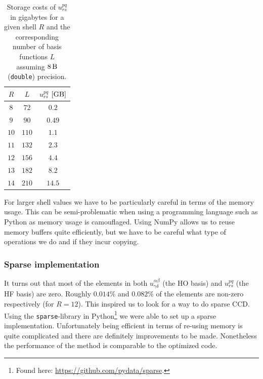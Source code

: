 \documentclass[
    a4paper, aps, twocolumn, floatfix, superscriptaddress,
    nofootinbib]{revtex4-1}
\newcommand{\1}{\mathds{1}}
\begin{document}
        \begin{table}
            \centering
            \caption{Storage costs of $u^{pq}_{rs}$ in gigabytes for a given
            shell $R$ and the corresponding number of basis functions $L$
            assuming $\SI{8}{\byte}$ (\texttt{double}) precision.}
            \begin{ruledtabular}
                \begin{tabular}{ccc}
                    $R$ & $L$ & $u^{pq}_{rs}$ $[\si{\giga\byte}]$ \\
                    \hline
                    $8$ & $72$ & $0.2$ \\
                    $9$ & $90$ & $0.49$ \\
                    $10$ & $110$ & $1.1$ \\
                    $11$ & $132$ & $2.3$ \\
                    $12$ & $156$ & $4.4$ \\
                    $13$ & $182$ & $8.2$ \\
                    $14$ & $210$ & $14.5$
                \end{tabular}
            \end{ruledtabular}
            \label{tab:memory_u}
        \end{table}

        For larger shell values we have to be particularly careful in terms of
        the memory usage. This can be semi-problematic when using a programming
        language such as Python as memory usage is camouflaged. Using NumPy
        allows us to reuse memory buffers quite efficiently, but we have to be
        careful what type of operations we do and if they incur copying.

        \subsubsection{Sparse implementation}
            It turns out that most of the elements in both
            $u^{\alpha\beta}_{\gamma\delta}$ (the HO basis) and $u^{pq}_{rs}$
            (the HF basis) are zero. Roughly $0.014\%$ and $0.082\%$ of the
            elements are non-zero respectively (for $R = 12$). This inspired us
            to look for a way to do sparse CCD. Using the
            \texttt{sparse}-library in Python\footnote{Found here:
            \url{https://github.com/pydata/sparse}.} we were able to set up a
            sparse implementation. Unfortunately being efficient in terms of
            re-using memory is quite complicated and there are definitely
            improvements to be made. Nonetheless the performance of the method
            is comparable to the optimized code.
\end{document}
